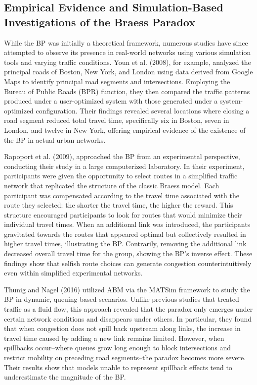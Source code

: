 \subsection{Empirical Evidence and Simulation-Based Investigations of the Braess Paradox}
\label{chap:bp_empirical}

While the BP was initially a theoretical framework, numerous studies have since attempted to observe its presence in real-world networks using various simulation tools and varying traffic conditions. Youn et al. (2008), for example, analyzed the principal roads of Boston, New York, and London using data derived from Google Maps to identify principal road segments and intersections. Employing the Bureau of Public Roads (BPR) function, they then compared the traffic patterns produced under a user-optimized system with those generated under a system-optimized configuration. Their findings revealed several locations where closing a road segment reduced total travel time, specifically six in Boston, seven in London, and twelve in New York, offering empirical evidence of the existence of the BP in actual urban networks. 

Rapoport et al. (2009), approached the BP from an experimental perspective, conducting their study in a large computerized laboratory. In their experiment, participants were given the opportunity to select routes in a simplified traffic network that replicated the structure of the classic Braess model. Each participant was compensated according to the travel time associated with the route they selected: the shorter the travel time, the higher the reward. This structure encouraged participants to look for routes that would minimize their individual travel times. When an additional link was introduced, the participants gravitated towards the routes that appeared optimal but collectively resulted in higher travel times, illustrating the BP. Contrarily, removing the additional link decreased overall travel time for the group, showing the BP's inverse effect. These findings show that selfish route choices can generate congestion counterintuitively even within simplified experimental networks.

Thunig and Nagel (2016) utilized ABM via the MATSim framework to study the BP in dynamic, queuing-based scenarios. Unlike previous studies that treated traffic as a fluid flow, this approach revealed that the paradox only emerges under certain network conditions and disappears under others. In particular, they found that when congestion does not spill back upstream along links, the increase in travel time caused by adding a new link remains limited. However, when spillbacks occur–where queues grow long enough to block intersections and restrict mobility on preceding road segments–the paradox becomes more severe. Their results show that models unable to represent spillback effects tend to underestimate the magnitude of the BP. 

